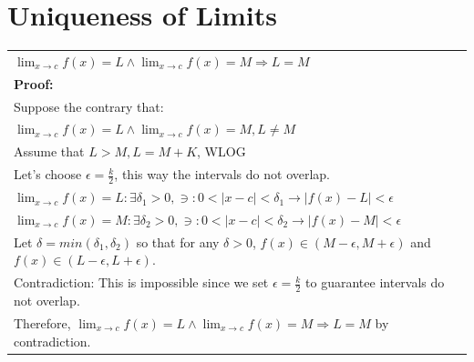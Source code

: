 \documentclass{article}
\begin{document}
\section{Uniqueness of Limits}

\begin{center}
{\renewcommand{\arraystretch}{1.3}
\begin{tabular}{l}
$\displaystyle \lim_{x \to c} f(x) = L \land \lim_{x \to c} f(x) = M \Longrightarrow L = M$\\
\textbf{Proof:}\\
Suppose the contrary that:\\
$\displaystyle \lim_{x \to c} f(x) = L \land \lim_{x \to c} f(x) = M, L \neq M$\\
Assume that $L > M, L = M + K$, WLOG\\
Let's choose $\epsilon = \displaystyle\frac{k}{2}$, this way the intervals do not overlap.\\
$\displaystyle \lim_{x \to c} f(x) = L: \exists \delta_1 > 0, \ni: 0 < |x - c| < \delta_1 \rightarrow |f(x) - L| < \epsilon$\\
$\displaystyle \lim_{x \to c} f(x) = M: \exists \delta_2 > 0, \ni: 0 < |x - c| < \delta_2 \rightarrow |f(x) - M| < \epsilon$\\
Let $\delta = min(\delta_1, \delta_2)$ so that for any $\delta > 0$, $f(x) \in (M - \epsilon, M + \epsilon)$ and $f(x) \in (L - \epsilon, L + \epsilon)$.\\
Contradiction: This is impossible since we set $\epsilon = \displaystyle\frac{k}{2}$ to guarantee intervals do not overlap.\\
Therefore, $\displaystyle \lim_{x \to c} f(x) = L \land \lim_{x \to c} f(x) = M \Longrightarrow L = M$ by contradiction.
\end{tabular}}
\end{center}
\end{document}
